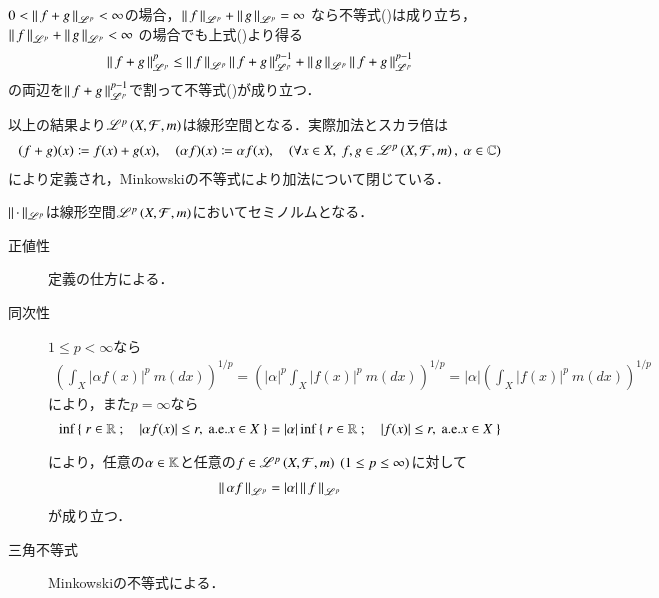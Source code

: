 \begin{prf}
\begin{description}
			$0 < \left\|\, f+g\, \right\|_{\mathscr{L}^p} < \infty$の場合，$\left\|\, f\, \right\|_{\mathscr{L}^p} + \left\|\, g\, \right\|_{\mathscr{L}^p} = \infty$
			なら不等式()は成り立ち，$\left\|\, f\, \right\|_{\mathscr{L}^p} + \left\|\, g\, \right\|_{\mathscr{L}^p} < \infty$
			の場合でも上式()より得る
			\begin{align}
				\left\|\, f+g\, \right\|_{\mathscr{L}^p}^p \leq \left\|\, f\, \right\|_{\mathscr{L}^p}\left\|\, f+g\, \right\|_{\mathscr{L}^p}^{p-1} + \left\|\, g\, \right\|_{\mathscr{L}^p}\left\|\, f+g\, \right\|_{\mathscr{L}^p}^{p-1}
			\end{align}
			の両辺を$\left\|\, f+g\, \right\|_{\mathscr{L}^p}^{p-1}$で割って不等式()が成り立つ．
			\QED
	\end{description}
\end{prf}

以上の結果より$\mathscr{L}^{p} \left(X,\mathcal{F},m\right)$は線形空間となる．実際加法とスカラ倍は
\begin{align}
	(f+g)(x) \coloneqq f(x) + g(x), \quad (\alpha f)(x) \coloneqq \alpha f(x), \quad (\forall x \in X,\ f,g \in \semiLp{p}{X,\mathcal{F},m},\ \alpha \in \C)
\end{align}
により定義され，Minkowskiの不等式により加法について閉じている．

\begin{itembox}[l]{}
	\begin{lem}
		$\left\|\, \cdot\, \right\|_{\mathscr{L}^p}$は線形空間$\mathscr{L}^{p} \left(X,\mathcal{F},m\right)$においてセミノルムとなる．
	\end{lem}
\end{itembox}
\begin{prf}\mbox{}
	\begin{description}
	\item[正値性] 定義の仕方による．
	\item[同次性] 
		$1 \leq p < \infty$なら
		\begin{align}
			\left( \int_{X} |\alpha f(x)|^p\ m(dx) \right)^{1/p} = \left( |\alpha|^p \int_{X} |f(x)|^p\ m(dx) \right)^{1/p} 
			= |\alpha| \left( \int_{X} |f(x)|^p\ m(dx) \right)^{1/p}
		\end{align}
		により，また$p = \infty$なら
		\begin{align}
			\operatorname*{inf}_{} \left\{\ r \in \mathbb{R}\ ;\quad |\alpha f(x)| \leq r,\ \mathrm{a.e.}x \in X\ \right\} = |\alpha|\operatorname*{inf}_{} \left\{\ r \in \mathbb{R}\ ;\quad |f(x)| \leq r,\ \mathrm{a.e.}x \in X\ \right\}
		\end{align}
		により，任意の$\alpha \in \mathbb{K}$と任意の$f \in \mathscr{L}^{p} \left(X,\mathcal{F},m\right)\ (1 \leq p \leq \infty)$に対して
		\begin{align}
			\left\|\, \alpha f\, \right\|_{\mathscr{L}^p} = |\alpha|\left\|\, f\, \right\|_{\mathscr{L}^p}
		\end{align}
		が成り立つ．
	\item[三角不等式] Minkowskiの不等式による．
	\QED
	\end{description}
\end{prf}

